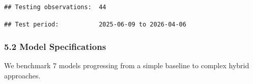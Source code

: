 \documentclass[
]{article}
\newenvironment{Shaded}{\begin{snugshade}}{\end{snugshade}}
\newcommand{\FunctionTok}[1]{\textcolor[rgb]{0.13,0.29,0.53}{\textbf{#1}}}
\newcommand{\NormalTok}[1]{#1}
\newcommand{\SpecialCharTok}[1]{\textcolor[rgb]{0.81,0.36,0.00}{\textbf{#1}}}
\newcommand{\StringTok}[1]{\textcolor[rgb]{0.31,0.60,0.02}{#1}}
\begin{document}
\begin{verbatim}
## Testing observations:  44
\end{verbatim}

\begin{Shaded}
\end{Shaded}

\begin{verbatim}
## Test period:           2025-06-09 to 2026-04-06
\end{verbatim}

\subsubsection{5.2 Model Specifications}\label{model-specifications}

We benchmark 7 models progressing from a simple baseline to complex
hybrid approaches.
\end{document}
